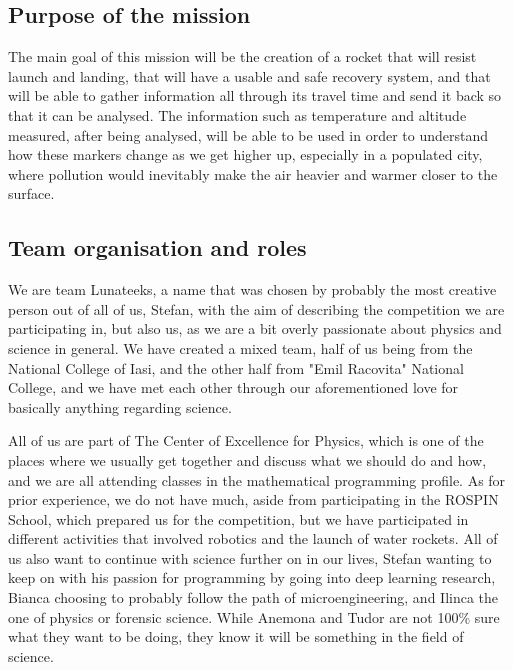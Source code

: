 \subsection{Purpose of the mission}

The main goal of this mission will be the creation of a rocket that will resist launch and landing, that will have a usable and safe recovery system, and that will be able to gather information all through its travel time and send it back so that it can be analysed. The information such as temperature and altitude measured, after being analysed, will be able to be used in order to understand how these markers change as we get higher up, especially in a populated city, where pollution would inevitably make the air heavier and warmer closer to the surface.

\subsection{Team organisation and roles}

We are team Lunateeks, a name that was chosen by probably the most creative person out of all of us, Stefan, with the aim of describing the competition we are participating in, but also us, as we are a bit overly passionate about physics and science in general. We have created a mixed team, half of us being from the National College of Iasi, and the other half from "Emil Racovita" National College, and we have met each other through our aforementioned love for basically anything regarding science. 

All of us are part of The Center of Excellence for Physics, which is one of the places where we usually get together and discuss what we should do and how, and we are all attending classes in the mathematical programming profile. As for prior experience, we do not have much, aside from participating in the ROSPIN School, which prepared us for the competition, but we have participated in different activities that involved robotics and the launch of water rockets. All of us also want to continue with science further on in our lives, Stefan wanting to keep on with his passion for programming by going into deep learning research, Bianca choosing to probably follow the path of microengineering, and Ilinca the one of physics or forensic science. While Anemona and Tudor are not 100\% sure what they want to be doing, they know it will be something in the field of science. 

